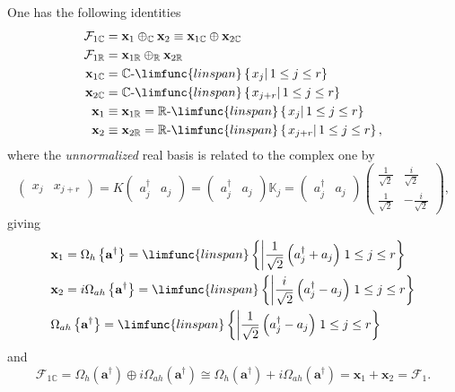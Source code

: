 \documentclass[aps,preprint]{revtex4}
\begin{document}
One has the following identities 
\begin{align}
\mathcal{F}_{1\mathbb{C}}& =\mathbf{x}_{1}\oplus _{\mathbb{C}}\mathbf{x}%
_{2}\equiv \mathbf{x}_{1\mathbb{C}}\oplus \mathbf{x}_{2\mathbb{C}} \\
\mathcal{F}_{1\mathbb{R}}& =\mathbf{x}_{1\mathbb{R}}\oplus _{\mathbb{R}}%
\mathbf{x}_{2\mathbb{R}} \\
\mathbf{x}_{1\mathbb{C}}& =\mathbb{C}\text{-}\limfunc{linspan}\left\{ \left.
x_{j}\right\vert 1\leq j\leq r\right\} \\
\mathbf{x}_{2\mathbb{C}}& =\mathbb{C}\text{-}\limfunc{linspan}\left\{ \left.
x_{j+r}\right\vert 1\leq j\leq r\right\} \\
\mathbf{x}_{1}& \equiv \mathbf{x}_{1\mathbb{R}}=\mathbb{R}\text{-}\limfunc{%
linspan}\left\{ \left. x_{j}\right\vert 1\leq j\leq r\right\} \\
\mathbf{x}_{2}& \equiv \mathbf{x}_{2\mathbb{R}}=\mathbb{R}\text{-}\limfunc{%
linspan}\left\{ \left. x_{j+r}\right\vert 1\leq j\leq r\right\} ,
\end{align}%
where the \emph{unnormalized} real basis is related to the complex one by%
\begin{equation}
\left( 
\begin{array}{cc}
x_{j} & x_{j+r}%
\end{array}%
\right) =K\left( 
\begin{array}{cc}
a_{j}^{\dagger } & a_{j}%
\end{array}%
\right) =\left( 
\begin{array}{cc}
a_{j}^{\dagger } & a_{j}%
\end{array}%
\right) \mathbb{K}_{j}=\left( 
\begin{array}{cc}
a_{j}^{\dagger } & a_{j}%
\end{array}%
\right) \left( 
\begin{array}{cc}
\frac{1}{\sqrt{2}} & \frac{i}{\sqrt{2}} \\ 
\frac{1}{\sqrt{2}} & -\frac{i}{\sqrt{2}}%
\end{array}%
\right) ,
\end{equation}%
giving%
\begin{align}
& \mathbf{x}_{1}=\Omega _{h}\left\{ \mathbf{a}^{\dagger }\right\} =\limfunc{%
linspan}\left\{ \left\vert \frac{1}{\sqrt{2}}\left( a_{j}^{\dagger
}+a_{j}\right) \right. 1\leq j\leq r\right\} \\
& \mathbf{x}_{2}=i\Omega _{ah}\left\{ \mathbf{a}^{\dagger }\right\} =%
\limfunc{linspan}\left\{ \left\vert \frac{i}{\sqrt{2}}\left( a_{j}^{\dagger
}-a_{j}\right) \right. 1\leq j\leq r\right\} \\
& \Omega _{ah}\left\{ \mathbf{a}^{\dagger }\right\} =\limfunc{linspan}%
\left\{ \left\vert \frac{1}{\sqrt{2}}\left( a_{j}^{\dagger }-a_{j}\right)
\right. 1\leq j\leq r\right\}
\end{align}%
and%
\begin{equation}
\mathcal{F}_{1\mathbb{C}}=\Omega _{h}\left( \mathbf{a}^{\dagger }\right)
\oplus i\Omega _{ah}\left( \mathbf{a}^{\dagger }\right) \cong \Omega
_{h}\left( \mathbf{a}^{\dagger }\right) +i\Omega _{ah}\left( \mathbf{a}%
^{\dagger }\right) =\mathbf{x}_{1}+\mathbf{x}_{2}=\mathcal{F}_{1}.
\end{equation}
\end{document}
